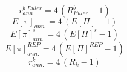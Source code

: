\begin{dmath}
{ r^{b.Euler}_{ann.} }=4\, \left({ R^b_{Euler} }-1\right)
\end{dmath}
\begin{dmath}
{ E[\pi]_{ann.} }=4\, \left({ E[\Pi] }-1\right)
\end{dmath}
\begin{dmath}
{ E[\pi]_{ann.}^{s} }=4\, \left({ E[\Pi]^{s} }-1\right)
\end{dmath}
\begin{dmath}
{ E[\pi]_{ann.}^{REP} }=4\, \left({ E[\Pi]^{REP} }-1\right)
\end{dmath}
\begin{dmath}
{ r^k_{ann.} }=4\, \left({ R_k }-1\right)
\end{dmath}
